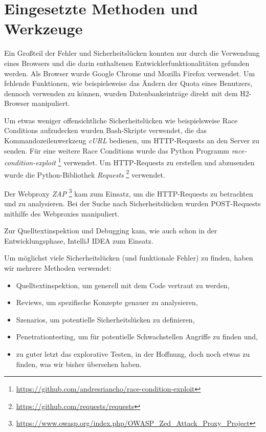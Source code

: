 \documentclass[12pt,DIV14,BCOR10mm,a4paper,parskip=half-,headsepline,headinclude,english,ngerman,bibliography=totocnumbered]{scrreprt}
\begin{document}
\chapter{Eingesetzte Methoden und Werkzeuge}

Ein Großteil der Fehler und Sicherheitslücken konnten nur durch die Verwendung eines Browsers und die darin enthaltenen Entwicklerfunktionalitäten gefunden werden. Als Browser wurde Google Chrome und Mozilla Firefox verwendet. Um fehlende Funktionen, wie beispielsweise das Ändern der Quota eines Benutzers, dennoch verwenden zu können, wurden Datenbankeinträge direkt mit dem H2-Browser manipuliert.

Um etwas weniger offensichtliche Sicherheitslücken wie beispielsweise Race Conditions aufzudecken wurden Bash-Skripte verwendet, die das Kommandozeilenwerkzeug \textit{cURL} bedienen, um HTTP-Requests an den Server zu senden. Für eine weitere Race Conditions wurde das Python Programm \textit{race-condition-exploit} \footnote{\url{https://github.com/andresriancho/race-condition-exploit}} verwendet. Um HTTP-Requests zu erstellen und abzusenden wurde die Python-Bibliothek \textit{Requests} \footnote{\url{https://github.com/requests/requests}} verwendet.

Der Webproxy \textit{ZAP} \footnote{\url{https://www.owasp.org/index.php/OWASP_Zed_Attack_Proxy_Project}} kam zum Einsatz, um die HTTP-Requests zu betrachten und zu analysieren. Bei der Suche nach Sicherheitslücken wurden POST-Requests mithilfe des Webproxies manipuliert.

Zur Quelltextinspektion und Debugging kam, wie auch schon in der Entwicklungsphase, IntelliJ IDEA zum Einsatz.

Um möglichst viele Sicherheitslücken (und funktionale Fehler) zu finden, haben wir mehrere Methoden verwendet:

\begin{itemize}
  \item Quelltextinspektion, um generell mit dem Code vertraut zu werden,
  \item Reviews, um spezifische Konzepte genauer zu analysieren,
  \item Szenarios, um potentielle Sicherheitslücken zu definieren,
  \item Penetrationtesting, um für potentielle Schwachstellen Angriffe zu finden und,
  \item zu guter letzt das explorative Testen, in der Hoffnung, doch noch etwas zu finden, was wir bisher übersehen haben.
\end{itemize}
\end{document}
